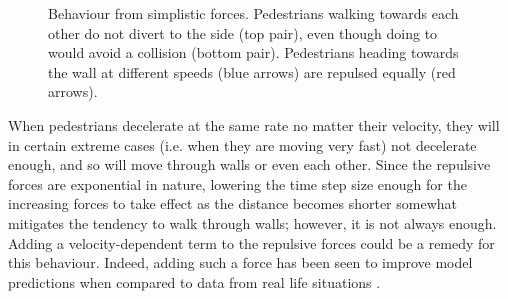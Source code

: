 \begin{figure}[h]
    \centering
    \caption[Behaviour from simplistic forces]{Behaviour from simplistic 
    forces.  Pedestrians walking towards each other 
    do not divert to the side (top pair), even though doing to would avoid a 
    collision (bottom pair).  Pedestrians 
    heading towards the wall at different speeds (blue arrows) are repulsed 
    equally (red arrows).}
    \label{fig:extra-forces-behaviour}
\end{figure}

When pedestrians decelerate at the same rate no matter their velocity, they 
will in certain extreme cases (i.e. when they are moving very fast) not 
decelerate enough, and so will move through walls or even each other. Since 
the repulsive forces are exponential in nature, lowering the time step size 
enough for the increasing forces to take effect as the distance becomes 
shorter somewhat mitigates the tendency to walk through walls; however, it is 
not always enough. Adding a velocity-dependent term to the repulsive forces 
could be a remedy for this behaviour. Indeed, adding such a force has been 
seen to improve model predictions when compared to data from real life 
situations \cite{ABconstant}.


